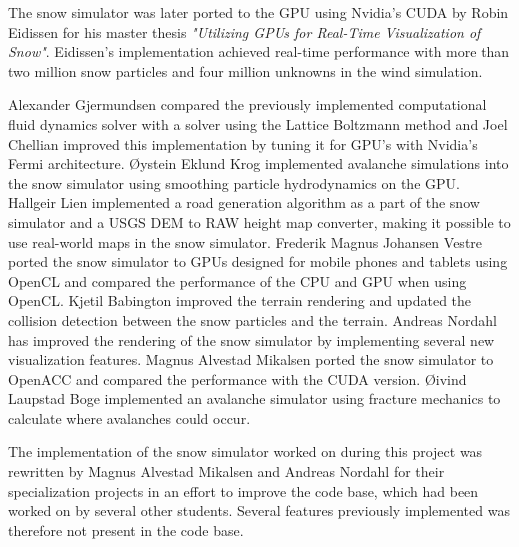 The snow simulator was later ported to the GPU using Nvidia's CUDA by Robin
Eidissen for his master thesis \emph{"Utilizing GPUs for Real-Time Visualization
of Snow"}\cite{gpuSnowThesis}. Eidissen's implementation achieved real-time
performance with more than two million snow particles and four million unknowns
in the wind simulation.

Alexander Gjermundsen\cite{lbmWind} compared the previously implemented
computational fluid dynamics solver with a solver using the Lattice Boltzmann
method and Joel Chellian\cite{fermi} improved this implementation by tuning it
for GPU's with Nvidia's Fermi architecture. Øystein Eklund Krog\cite{avalanche1}
implemented avalanche simulations into the snow simulator using smoothing
particle hydrodynamics on the GPU. Hallgeir Lien\cite{road} implemented a road
generation algorithm as a part of the snow simulator and a USGS DEM to RAW
height map converter, making it possible to use real-world maps in the snow
simulator. Frederik Magnus Johansen Vestre\cite{openclSnowThesis} ported the
snow simulator to GPUs designed for mobile phones and tablets using OpenCL and
compared the performance of the CPU and GPU when using OpenCL. Kjetil
Babington\cite{snowTerrainThesis} improved the terrain rendering and updated the
collision detection between the snow particles and the terrain. Andreas
Nordahl\cite{realisticSnowTerrainThesis} has improved the rendering of the snow
simulator by implementing several new visualization features. Magnus Alvestad
Mikalsen\cite{openAccThesis} ported the snow simulator to OpenACC and compared
the performance with the CUDA version. Øivind Laupstad Boge\cite{avalanche2}
implemented an avalanche simulator using fracture mechanics to calculate where
avalanches could occur.

The implementation of the snow simulator worked on during this project was rewritten 
by Magnus Alvestad Mikalsen and Andreas Nordahl for their specialization projects 
in an effort to improve the code base, which had been worked on by several other 
students. Several features previously implemented was therefore not present in 
the code base\cite{openAccThesis, realisticSnowTerrainThesis}. 

